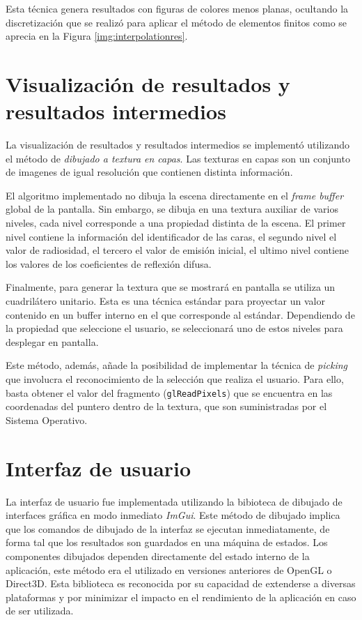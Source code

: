 Esta técnica genera resultados con figuras de colores menos planas, ocultando la discretización que se realizó para aplicar el método de elementos finitos como se aprecia en la Figura \ref{img:interpolationres}.

\section {Visualización de resultados y resultados intermedios}

La visualización de resultados y resultados intermedios se implementó utilizando el método de \textit{dibujado a textura en capas}. Las texturas en capas son un conjunto de imagenes de igual resolución que contienen distinta información.

El algoritmo implementado no dibuja la escena directamente en el \textit{frame buffer} global de la pantalla. Sin embargo, se dibuja en una textura auxiliar de varios niveles, cada nivel corresponde a una propiedad distinta de la escena. El primer nivel contiene la información del identificador de las caras, el segundo nivel el valor de radiosidad, el tercero el valor de emisión inicial, el ultimo nivel contiene los valores de los coeficientes de reflexión difusa.

Finalmente, para generar la textura que se mostrará en pantalla se utiliza un cuadrilátero unitario. Esta es una técnica estándar para proyectar un valor contenido en un buffer interno en el que corresponde al estándar. Dependiendo de la propiedad que seleccione el usuario, se seleccionará uno de estos niveles para desplegar en pantalla.

Este método, además, añade la posibilidad de implementar la técnica de \textit{picking} que involucra el reconocimiento de la selección que realiza el usuario. Para ello, basta obtener el valor del fragmento (\verb|glReadPixels|) que se encuentra en las coordenadas del puntero dentro de la textura, que son suministradas por el Sistema Operativo.

\section {Interfaz de usuario}

La interfaz de usuario fue implementada utilizando la bibioteca de dibujado de interfaces gráfica en modo inmediato \textit{ImGui}. Este método de dibujado implica que los comandos de dibujado de la interfaz se ejecutan inmediatamente, de forma tal que los resultados son guardados en una máquina de estados. Los componentes dibujados dependen directamente del estado interno de la aplicación, este método era el utilizado en versiones anteriores de OpenGL o Direct3D. Esta biblioteca es reconocida por su capacidad de extenderse a diversas plataformas y por minimizar el impacto en el rendimiento de la aplicación en caso de ser utilizada.
